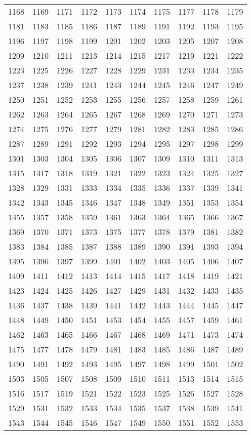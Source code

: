 \begin{longtable}{*{10}{l}}
1168&1169&1171&1172&1173&1174&1175&1177&1178&1179\\
1181&1183&1185&1186&1187&1189&1191&1192&1193&1195\\
1196&1197&1198&1199&1201&1202&1203&1205&1207&1208\\
1209&1210&1211&1213&1214&1215&1217&1219&1221&1222\\
1223&1225&1226&1227&1228&1229&1231&1233&1234&1235\\
1237&1238&1239&1241&1243&1244&1245&1246&1247&1249\\
1250&1251&1252&1253&1255&1256&1257&1258&1259&1261\\
1262&1263&1264&1265&1267&1268&1269&1270&1271&1273\\
1274&1275&1276&1277&1279&1281&1282&1283&1285&1286\\
1287&1289&1291&1292&1293&1294&1295&1297&1298&1299\\
1301&1303&1304&1305&1306&1307&1309&1310&1311&1313\\
1315&1317&1318&1319&1321&1322&1323&1324&1325&1327\\
1328&1329&1331&1333&1334&1335&1336&1337&1339&1341\\
1342&1343&1345&1346&1347&1348&1349&1351&1353&1354\\
1355&1357&1358&1359&1361&1363&1364&1365&1366&1367\\
1369&1370&1371&1373&1375&1377&1378&1379&1381&1382\\
1383&1384&1385&1387&1388&1389&1390&1391&1393&1394\\
1395&1396&1397&1399&1401&1402&1403&1405&1406&1407\\
1409&1411&1412&1413&1414&1415&1417&1418&1419&1421\\
1423&1424&1425&1426&1427&1429&1431&1432&1433&1435\\
1436&1437&1438&1439&1441&1442&1443&1444&1445&1447\\
1448&1449&1450&1451&1453&1454&1455&1457&1459&1461\\
1462&1463&1465&1466&1467&1468&1469&1471&1473&1474\\
1475&1477&1478&1479&1481&1483&1485&1486&1487&1489\\
1490&1491&1492&1493&1495&1497&1498&1499&1501&1502\\
1503&1505&1507&1508&1509&1510&1511&1513&1514&1515\\
1516&1517&1519&1521&1522&1523&1525&1526&1527&1528\\
1529&1531&1532&1533&1534&1535&1537&1538&1539&1541\\
1543&1544&1545&1546&1547&1549&1550&1551&1552&1553\\

\end{longtable}
